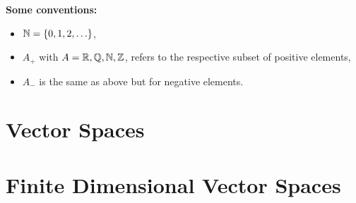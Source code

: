 \documentclass[12pt]{article}
\begin{document}
\maketitle
\tableofcontents
\newpage
\textbf{Some conventions:} 
\begin{itemize}
    \item $\mathbb{N} = \{0,1,2, \ldots \}$,
    \item $A_+$ with $A = \mathbb{R}, \mathbb{Q}, \mathbb{N}, \mathbb{Z}$, refers to the respective subset of positive elements,
    \item $A_-$ is the same as above but for negative elements. 
\end{itemize}
\section{Vector Spaces}

\section{Finite Dimensional Vector Spaces}

\end{document}
